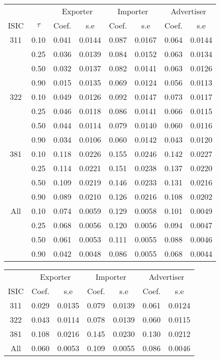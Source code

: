 \documentclass[11pt]{article}
\begin{document}
\begin{table}[H]
\centering
\begin{tabular}{cccccccc}
  \hline\hline & & \multicolumn{2}{c}{Exporter}  & \multicolumn{2}{c}{Importer} & \multicolumn{2}{c}{Advertiser} \\ \cmidrule(lr){3-4} \cmidrule(lr){5-6} \cmidrule(lr){7-8}ISIC & $\tau$ & Coef. & s.e & Coef. & s.e & Coef. & s.e \\ 
  \hline
311 & 0.10 & 0.041 & 0.0144 & 0.087 & 0.0167 & 0.064 & 0.0144 \\ 
   & 0.25 & 0.036 & 0.0139 & 0.084 & 0.0152 & 0.063 & 0.0134 \\ 
   & 0.50 & 0.032 & 0.0137 & 0.082 & 0.0141 & 0.063 & 0.0126 \\ 
   & 0.90 & 0.015 & 0.0135 & 0.069 & 0.0124 & 0.056 & 0.0113 \\ 
  322 & 0.10 & 0.049 & 0.0126 & 0.092 & 0.0147 & 0.073 & 0.0117 \\ 
   & 0.25 & 0.046 & 0.0118 & 0.086 & 0.0141 & 0.066 & 0.0115 \\ 
   & 0.50 & 0.044 & 0.0114 & 0.079 & 0.0140 & 0.060 & 0.0116 \\ 
   & 0.90 & 0.034 & 0.0106 & 0.060 & 0.0142 & 0.043 & 0.0120 \\ 
  381 & 0.10 & 0.118 & 0.0226 & 0.155 & 0.0246 & 0.142 & 0.0227 \\ 
   & 0.25 & 0.114 & 0.0221 & 0.151 & 0.0238 & 0.137 & 0.0220 \\ 
   & 0.50 & 0.109 & 0.0219 & 0.146 & 0.0233 & 0.131 & 0.0216 \\ 
   & 0.90 & 0.089 & 0.0210 & 0.126 & 0.0216 & 0.108 & 0.0202 \\ 
  All & 0.10 & 0.074 & 0.0059 & 0.129 & 0.0058 & 0.101 & 0.0049 \\ 
   & 0.25 & 0.068 & 0.0056 & 0.120 & 0.0056 & 0.094 & 0.0047 \\ 
   & 0.50 & 0.061 & 0.0053 & 0.111 & 0.0055 & 0.088 & 0.0046 \\ 
   & 0.90 & 0.042 & 0.0048 & 0.086 & 0.0055 & 0.068 & 0.0044 \\ 
   \hline
\end{tabular}
\end{table}

\begin{table}[H]
\centering
\begin{tabular}{ccccccc}
  \hline\hline & \multicolumn{2}{c}{Exporter}  & \multicolumn{2}{c}{Importer} & \multicolumn{2}{c}{Advertiser} \\ \cmidrule(lr){2-3} \cmidrule(lr){4-5} \cmidrule(lr){6-7}ISIC & Coef. & s.e & Coef. & s.e & Coef. & s.e \\ 
  \hline
311 & 0.029 & 0.0135 & 0.079 & 0.0139 & 0.061 & 0.0124 \\ 
  322 & 0.043 & 0.0114 & 0.078 & 0.0139 & 0.060 & 0.0115 \\ 
  381 & 0.108 & 0.0216 & 0.145 & 0.0230 & 0.130 & 0.0212 \\ 
  All & 0.060 & 0.0053 & 0.109 & 0.0055 & 0.086 & 0.0046 \\ 
   \hline
\end{tabular}
\end{table}
\end{document}
